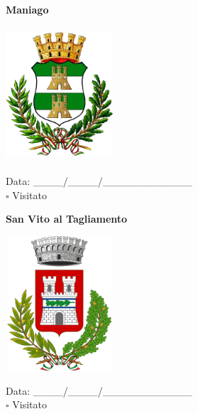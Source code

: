 \documentclass[a5paper,12pt]{article}
\begin{document}
\newpage

\noindent
\begin{minipage}[t]{0.45\textwidth}
    \begin{center}
        \textbf{Maniago}
    \end{center}
    \vspace{-0.5cm} %
    \begin{center}
        \includegraphics[height= 5cm, width=4cm]{Friuli Venezia Giulia/Maniago-Stemma.png}
    \end{center}
    \vspace{-0.4cm} %
    \begin{flushleft}
        Data: \_\_\_\_/\_\_\_\_/\_\_\_\_\_\_\_\_\_\_\_\_ \\
        $\square$ Visitato
    \end{flushleft}
\end{minipage}
\hfill
\noindent
\begin{minipage}[t]{0.45\textwidth}
    \begin{center}
        \textbf{San Vito al Tagliamento}
    \end{center}
    \vspace{-0.5cm} %
    \begin{center}
        \includegraphics[height= 5cm, width=4cm]{Friuli Venezia Giulia/San_Vito_al_Tagliamento-Stemma.svg.png}
    \end{center}
    \vspace{-0.4cm} %
    \begin{flushleft}
        Data: \_\_\_\_/\_\_\_\_/\_\_\_\_\_\_\_\_\_\_\_\_ \\
        $\square$ Visitato
    \end{flushleft}
\end{minipage}
\end{document}
